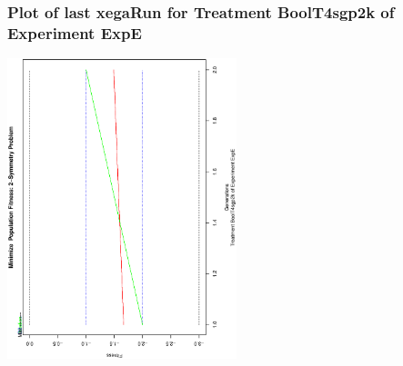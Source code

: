  \begin{frame}
 \frametitle{ Plot of last xegaRun for Treatment BoolT4sgp2k of Experiment ExpE }
 \begin{center}
\includegraphics[width=0.5\textwidth, angle=-90]
{ExpEPlotPopStatsFigure000.eps}
 \end{center}
 \label{report/ExpEPlotPopStatsFigure000.eps}  
 \end{frame}

